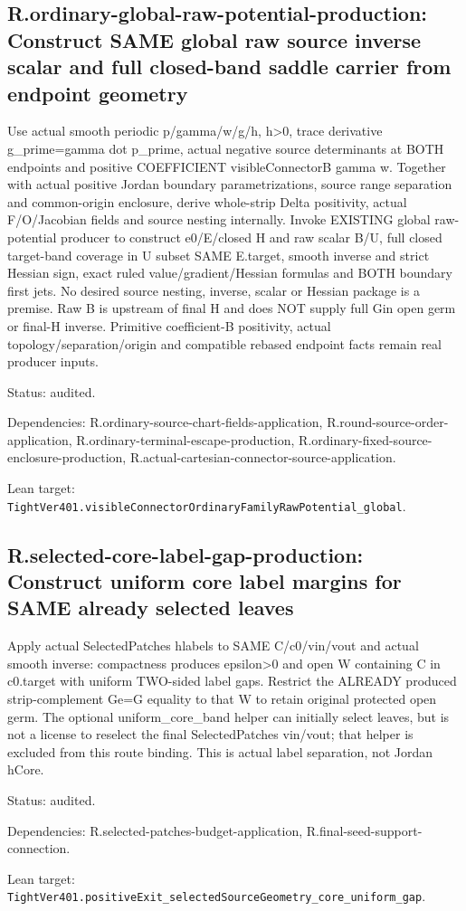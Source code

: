 \documentclass{article}
\begin{document}
\subsection*{R.ordinary-global-raw-potential-production: Construct SAME global raw source inverse scalar and full closed-band saddle carrier from endpoint geometry}
Use actual smooth periodic p/gamma/w/g/h, h>0, trace derivative g\_prime=gamma dot p\_prime, actual negative source determinants at BOTH endpoints and positive COEFFICIENT visibleConnectorB gamma w. Together with actual positive Jordan boundary parametrizations, source range separation and common-origin enclosure, derive whole-strip Delta positivity, actual F/O/Jacobian fields and source nesting internally. Invoke EXISTING global raw-potential producer to construct e0/E/closed H and raw scalar B/U, full closed target-band coverage in U subset SAME E.target, smooth inverse and strict Hessian sign, exact ruled value/gradient/Hessian formulas and BOTH boundary first jets. No desired source nesting, inverse, scalar or Hessian package is a premise. Raw B is upstream of final H and does NOT supply full Gin open germ or final-H inverse. Primitive coefficient-B positivity, actual topology/separation/origin and compatible rebased endpoint facts remain real producer inputs.
\par Status: audited.
\par Dependencies: R.ordinary-source-chart-fields-application, R.round-source-order-application, R.ordinary-terminal-escape-production, R.ordinary-fixed-source-enclosure-production, R.actual-cartesian-connector-source-application.
\par Lean target: \texttt{TightVer401.visibleConnectorOrdinaryFamilyRawPotential\_global}.
\subsection*{R.selected-core-label-gap-production: Construct uniform core label margins for SAME already selected leaves}
Apply actual SelectedPatches hlabels to SAME C/c0/vin/vout and actual smooth inverse: compactness produces epsilon>0 and open W containing C in c0.target with uniform TWO-sided label gaps. Restrict the ALREADY produced strip-complement Ge=G equality to that W to retain original protected open germ. The optional uniform\_core\_band helper can initially select leaves, but is not a license to reselect the final SelectedPatches vin/vout; that helper is excluded from this route binding. This is actual label separation, not Jordan hCore.
\par Status: audited.
\par Dependencies: R.selected-patches-budget-application, R.final-seed-support-connection.
\par Lean target: \texttt{TightVer401.positiveExit\_selectedSourceGeometry\_core\_uniform\_gap}.
\end{document}
